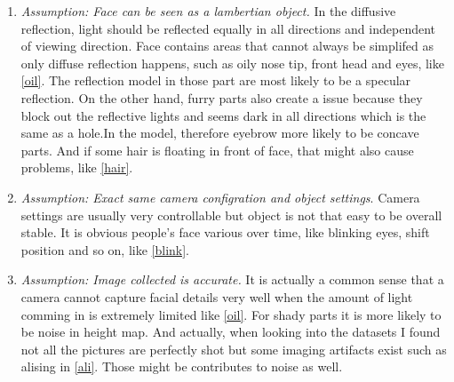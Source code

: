 \documentclass[a4paper]{article}
\begin{document}
\begin{enumerate}
\item \emph{Assumption: Face can be seen as a lambertian object.}  In the diffusive reflection, light should be reflected equally in all directions and independent of viewing direction. Face contains areas that cannot always be simplifed as only diffuse reflection happens, such as oily nose tip, front head and eyes, like \ref{oil}. The reflection model in those part are most likely to be a specular reflection. On the other hand, furry parts also create a issue because they block out the reflective lights and seems dark in all directions which is the same as a hole.In the model, therefore eyebrow more likely to be concave parts. And if some hair is floating in front of face, that might also cause problems, like \ref{hair}.

\item \emph{Assumption: Exact same camera configration and object settings}.  Camera settings are usually very controllable but object is not that easy to be overall stable. It is obvious people's face various over time, like blinking eyes, shift position and so on, like  \ref{blink}.

\item \emph{Assumption: Image collected is accurate.} It is actually a common sense that a camera cannot capture facial details very well when the amount of light comming in is extremely limited like \ref{oil}. For shady parts it is more likely to be noise in height map. And actually, when looking into the datasets I found not all the pictures are perfectly shot but some imaging artifacts exist such as alising in \ref{ali}. Those might be contributes to noise as well.
\end{enumerate}
\end{document}
